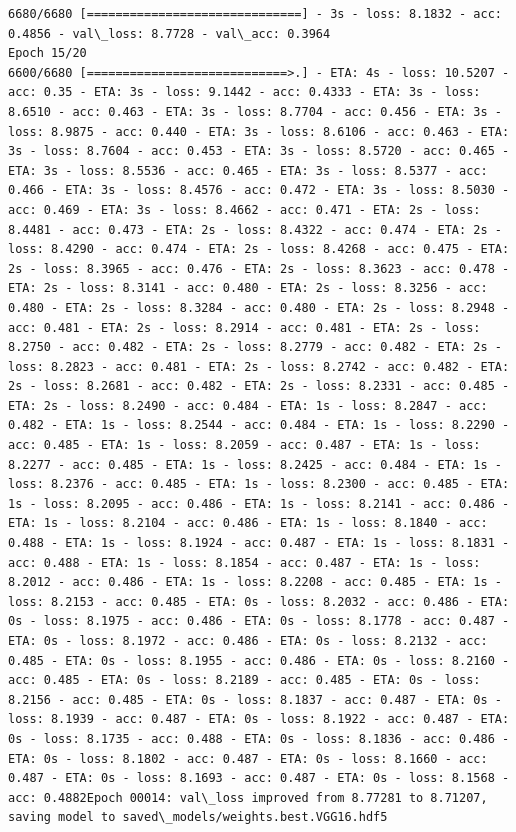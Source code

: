 \documentclass[11pt]{article}
\begin{document}
\begin{Verbatim}[commandchars=\\\{\}]
6680/6680 [==============================] - 3s - loss: 8.1832 - acc: 0.4856 - val\_loss: 8.7728 - val\_acc: 0.3964
Epoch 15/20
6600/6680 [============================>.] - ETA: 4s - loss: 10.5207 - acc: 0.35 - ETA: 3s - loss: 9.1442 - acc: 0.4333 - ETA: 3s - loss: 8.6510 - acc: 0.463 - ETA: 3s - loss: 8.7704 - acc: 0.456 - ETA: 3s - loss: 8.9875 - acc: 0.440 - ETA: 3s - loss: 8.6106 - acc: 0.463 - ETA: 3s - loss: 8.7604 - acc: 0.453 - ETA: 3s - loss: 8.5720 - acc: 0.465 - ETA: 3s - loss: 8.5536 - acc: 0.465 - ETA: 3s - loss: 8.5377 - acc: 0.466 - ETA: 3s - loss: 8.4576 - acc: 0.472 - ETA: 3s - loss: 8.5030 - acc: 0.469 - ETA: 3s - loss: 8.4662 - acc: 0.471 - ETA: 2s - loss: 8.4481 - acc: 0.473 - ETA: 2s - loss: 8.4322 - acc: 0.474 - ETA: 2s - loss: 8.4290 - acc: 0.474 - ETA: 2s - loss: 8.4268 - acc: 0.475 - ETA: 2s - loss: 8.3965 - acc: 0.476 - ETA: 2s - loss: 8.3623 - acc: 0.478 - ETA: 2s - loss: 8.3141 - acc: 0.480 - ETA: 2s - loss: 8.3256 - acc: 0.480 - ETA: 2s - loss: 8.3284 - acc: 0.480 - ETA: 2s - loss: 8.2948 - acc: 0.481 - ETA: 2s - loss: 8.2914 - acc: 0.481 - ETA: 2s - loss: 8.2750 - acc: 0.482 - ETA: 2s - loss: 8.2779 - acc: 0.482 - ETA: 2s - loss: 8.2823 - acc: 0.481 - ETA: 2s - loss: 8.2742 - acc: 0.482 - ETA: 2s - loss: 8.2681 - acc: 0.482 - ETA: 2s - loss: 8.2331 - acc: 0.485 - ETA: 2s - loss: 8.2490 - acc: 0.484 - ETA: 1s - loss: 8.2847 - acc: 0.482 - ETA: 1s - loss: 8.2544 - acc: 0.484 - ETA: 1s - loss: 8.2290 - acc: 0.485 - ETA: 1s - loss: 8.2059 - acc: 0.487 - ETA: 1s - loss: 8.2277 - acc: 0.485 - ETA: 1s - loss: 8.2425 - acc: 0.484 - ETA: 1s - loss: 8.2376 - acc: 0.485 - ETA: 1s - loss: 8.2300 - acc: 0.485 - ETA: 1s - loss: 8.2095 - acc: 0.486 - ETA: 1s - loss: 8.2141 - acc: 0.486 - ETA: 1s - loss: 8.2104 - acc: 0.486 - ETA: 1s - loss: 8.1840 - acc: 0.488 - ETA: 1s - loss: 8.1924 - acc: 0.487 - ETA: 1s - loss: 8.1831 - acc: 0.488 - ETA: 1s - loss: 8.1854 - acc: 0.487 - ETA: 1s - loss: 8.2012 - acc: 0.486 - ETA: 1s - loss: 8.2208 - acc: 0.485 - ETA: 1s - loss: 8.2153 - acc: 0.485 - ETA: 0s - loss: 8.2032 - acc: 0.486 - ETA: 0s - loss: 8.1975 - acc: 0.486 - ETA: 0s - loss: 8.1778 - acc: 0.487 - ETA: 0s - loss: 8.1972 - acc: 0.486 - ETA: 0s - loss: 8.2132 - acc: 0.485 - ETA: 0s - loss: 8.1955 - acc: 0.486 - ETA: 0s - loss: 8.2160 - acc: 0.485 - ETA: 0s - loss: 8.2189 - acc: 0.485 - ETA: 0s - loss: 8.2156 - acc: 0.485 - ETA: 0s - loss: 8.1837 - acc: 0.487 - ETA: 0s - loss: 8.1939 - acc: 0.487 - ETA: 0s - loss: 8.1922 - acc: 0.487 - ETA: 0s - loss: 8.1735 - acc: 0.488 - ETA: 0s - loss: 8.1836 - acc: 0.486 - ETA: 0s - loss: 8.1802 - acc: 0.487 - ETA: 0s - loss: 8.1660 - acc: 0.487 - ETA: 0s - loss: 8.1693 - acc: 0.487 - ETA: 0s - loss: 8.1568 - acc: 0.4882Epoch 00014: val\_loss improved from 8.77281 to 8.71207, saving model to saved\_models/weights.best.VGG16.hdf5

\end{Verbatim}
\end{document}
